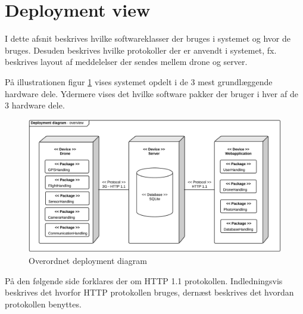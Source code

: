 \section{Deployment view}

I dette afsnit beskrives hvilke softwareklasser der bruges i systemet og hvor de bruges. Desuden beskrives hvilke protokoller der er anvendt i systemet, fx. beskrives layout af meddelelser der sendes mellem drone og server.


På illustrationen figur \ref{fig:deployment_generel} vises systemet opdelt i de 3 mest grundlæggende hardware dele. Ydermere vises det hvilke software pakker der bruger i hver af de 3 hardware dele.  

\begin{figure}[H]
\centering
\includegraphics[width=1\textwidth]{Billeder/deployment_overview.png}
\caption{Overordnet deployment diagram}
\label{fig:deployment_generel}
\end{figure}

På den følgende side forklares der om HTTP 1.1 protokollen. Indledningsvis beskrives det hvorfor HTTP protokollen bruges, dernæst beskrives det hvordan protokollen benyttes. 


\newpage

